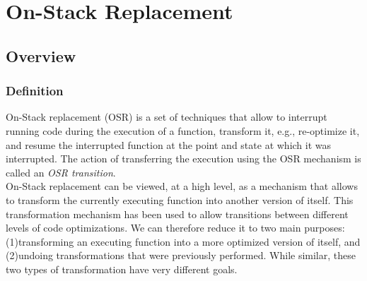 
\chapter{On-Stack Replacement} %

\label{Chapter2} %


\newcommand{\keyword}[1]{\textbf{#1}}
\newcommand{\tabhead}[1]{\textbf{#1}}
\newcommand{\code}[1]{\texttt{#1}}
\newcommand{\file}[1]{\texttt{\bfseries#1}}
\newcommand{\option}[1]{\texttt{\itshape#1}}

\section{Overview}
\subsection{Definition}
On-Stack replacement (OSR) is a set of techniques that allow to interrupt running code during the execution of a function, transform it, e.g., re-optimize it, and resume the interrupted function at the point and state at which it was interrupted.
The action of transferring the execution using the OSR mechanism is called an \textit{OSR transition}.\\

On-Stack replacement can be viewed, at a high level, as a mechanism that allows to transform the currently executing function into another version of itself.
This transformation mechanism has been used to allow transitions between different levels of code optimizations.
We can therefore reduce it to two main purposes: (1)transforming an executing function into a more optimized version of itself, and (2)undoing transformations that were previously performed.
While similar, these two types of transformation have very different goals.\\

